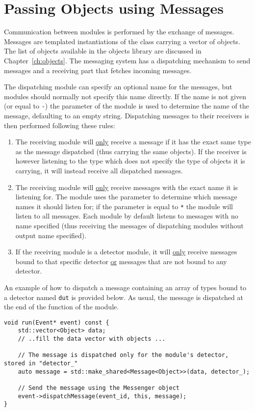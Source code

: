 \section{Passing Objects using Messages}
\label{sec:objects_messages}
Communication between modules is performed by the exchange of messages.
Messages are templated instantiations of the  class carrying a vector of objects.
The list of objects available in the \apsq objects library are discussed in Chapter~\ref{ch:objects}.
The messaging system has a dispatching mechanism to send messages and a receiving part that fetches incoming messages.

The dispatching module can specify an optional name for the messages, but modules should normally not specify this name directly.
If the name is not given (or equal to \texttt{-}) the  parameter of the module is used to determine the name of the message, defaulting to an empty string.
Dispatching messages to their receivers is then performed following these rules:
\begin{enumerate}
    \item The receiving module will \underline{only} receive a message if it has the exact same type as the message dispatched (thus carrying the same objects).
    If the receiver is however listening to the  type which does not specify the type of objects it is carrying, it will instead receive all dispatched messages.
    \item The receiving module will \underline{only} receive messages with the exact name it is listening for.
    The module uses the  parameter to determine which message names it should listen for; if the  parameter is equal to \texttt{*} the module will listen to all messages.
    Each module by default listens to messages with no name specified (thus receiving the messages of dispatching modules without output name specified).
    \item If the receiving module is a detector module, it will \underline{only} receive messages bound to that specific detector \underline{or} messages that are not bound to any detector.
\end{enumerate}

An example of how to dispatch a message containing an array of  types bound to a detector named \texttt{dut} is provided below.
As usual, the message is dispatched at the end of the  function of the module.
\begin{verbatim}
void run(Event* event) const {
    std::vector<Object> data;
    // ..fill the data vector with objects ...

    // The message is dispatched only for the module's detector, stored in "detector_"
    auto message = std::make_shared<Message<Object>>(data, detector_);

    // Send the message using the Messenger object
    event->dispatchMessage(event_id, this, message);
}
\end{verbatim}

